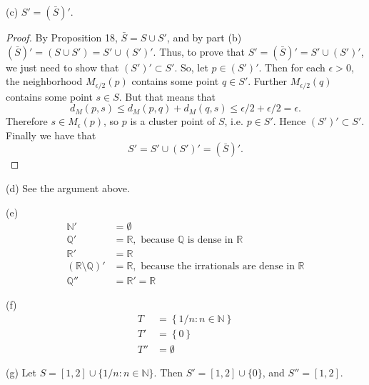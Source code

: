 \documentclass[11pt]{amsart}
\begin{document}
(c) $S' = (\bar{S})'$.

\begin{proof}
  By Proposition 18, $\bar{S} = S\cup S'$, and by part (b) $(\bar{S})' = (S\cup S') = S' \cup (S')'$. Thus, to prove that $S' = (\bar{S})' = S' \cup (S')'$, we just need to show that $(S')' \subset S'$. So, let $p \in (S')'$. Then for each $\epsilon > 0$, the neighborhood $M_{\epsilon/2}(p)$ contains some point $q \in S'$. Further $M_{\epsilon/2}(q)$ contains some point $s \in S$. But that means that 
  \[ d_{M}(p,s) \leq d_{M}(p,q) + d_{M}(q,s) \leq \epsilon/2 + \epsilon/2 = \epsilon. \]
  Therefore $s \in M_{\epsilon}(p)$, so $p$ is a cluster point of $S$, i.e. $p\in S'$. Hence $(S')' \subset S'$. Finally we have that 
  \[ S' = S' \cup (S')' = (\bar{S})'. \]
\end{proof}

(d) See the argument above.

(e) 
\begin{align*}
  \mathbb{N}' & = \emptyset \\
  \mathbb{Q}' & = \mathbb{R}, \text{ because }\mathbb{Q}\text{ is dense in }\mathbb{R} \\
  \mathbb{R}' & = \mathbb{R} \\
  (\mathbb{R} \setminus \mathbb{Q})' & = \mathbb{R}, \text{ because the irrationals are dense in }\mathbb{R} \\
  \mathbb{Q}'' & = \mathbb{R}' = \mathbb{R}
\end{align*}

(f) 
\begin{align*}
  T & = \left\{ 1/n : n \in \mathbb{N} \right\} \\
  T' & = \left\{ 0 \right\} \\
  T'' & = \emptyset 
\end{align*}

(g) Let $S = [1,2] \cup \{1/n : n\in\mathbb{N}\}$. Then $S' = [1,2] \cup \{0\}$, and $S'' = [1,2]$.
\end{document}
